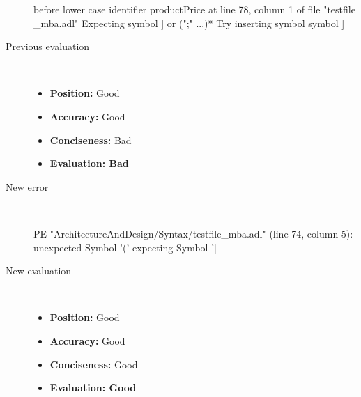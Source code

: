 \begin{description}
\begin{haskell}
before lower case identifier productPrice at line 78, column 1 of file "testfile
_mba.adl"
Expecting symbol ] or (";" ...)*
Try inserting symbol symbol ]
\end{haskell}
  \item[Previous evaluation]~\\
    \begin{itemize}
    \item \textbf{Position:} Good
    \item \textbf{Accuracy:} Good
    \item \textbf{Conciseness:} Bad
    \item \textbf{Evaluation: Bad}
    \end{itemize}
  \item[New error]~\\
\begin{haskell}
PE "ArchitectureAndDesign/Syntax/testfile_mba.adl" (line 74, column 5):
unexpected Symbol '('
expecting Symbol '[\end{haskell}
  \item[New evaluation]~\\
    \begin{itemize}
    \item \textbf{Position:} Good
    \item \textbf{Accuracy:} Good
    \item \textbf{Conciseness:} Good
    \item \textbf{Evaluation: Good}
    \end{itemize}
  \end{description}

\hrulefill

